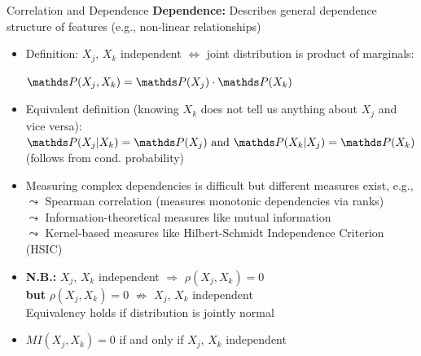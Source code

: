 \documentclass[11pt,compress,t,notes=noshow, aspectratio=169, xcolor=table]{beamer}
\begin{document}
\begin{frame}{Correlation and Dependence}
\textbf{Dependence:} Describes general dependence structure of features (e.g., non-linear relationships)

\begin{itemize}[<+->]
\item Definition: $X_j$, $X_k$ independent $\Leftrightarrow$ joint distribution is product of marginals:\\ \vspace{5pt}
\centerline{$\P(X_j, X_k) = \P(X_j) \cdot \P(X_k)$}
\vspace{5pt}
\item Equivalent definition (knowing $X_k$ does not tell us anything about $X_j$ and vice versa): \\
\vspace{5pt}
\phantom{AAA} $\P(X_j|X_k) = \P(X_j) \text{ and } \P(X_k|X_j) = \P(X_k)$ \hfill (follows from cond. probability) \phantom{AAA}
\vspace{5pt}
\item Measuring complex dependencies is difficult but different measures exist, e.g., \\
$\leadsto$ Spearman correlation (measures monotonic dependencies via ranks) \\
$\leadsto$ Information-theoretical measures like mutual information \\
$\leadsto$ Kernel-based measures like Hilbert-Schmidt Independence Criterion (HSIC)
\item \textbf{N.B.:} $X_j$, $X_k$ independent $\Rightarrow$ $\rho(X_j, X_k) = 0$ \\ \textbf{but} $\rho(X_j, X_k) = 0$ $\nRightarrow$ $X_j$, $X_k$  independent \\
Equivalency holds if distribution is jointly normal
\item  $MI(X_j, X_k) = 0$ if and only if $X_j$, $X_k$ independent
\end{itemize}
\end{frame}
\end{document}
